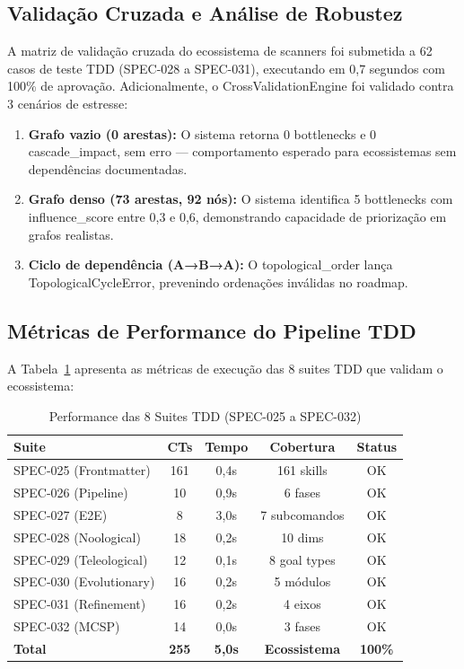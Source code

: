 \subsection{Validação Cruzada e Análise de Robustez}

A matriz de validação cruzada do ecossistema de scanners foi submetida a 62 casos de teste TDD (SPEC-028 a SPEC-031), executando em 0,7 segundos com 100\% de aprovação. Adicionalmente, o CrossValidationEngine foi validado contra 3 cenários de estresse:

\begin{enumerate}
  \item \textbf{Grafo vazio (0 arestas):} O sistema retorna 0 bottlenecks e 0 cascade\_impact, sem erro --- comportamento esperado para ecossistemas sem dependências documentadas.
  \item \textbf{Grafo denso (73 arestas, 92 nós):} O sistema identifica 5 bottlenecks com influence\_score entre 0,3 e 0,6, demonstrando capacidade de priorização em grafos realistas.
  \item \textbf{Ciclo de dependência (A→B→A):} O topological\_order lança TopologicalCycleError, prevenindo ordenações inválidas no roadmap.
\end{enumerate}

\subsection{Métricas de Performance do Pipeline TDD}

A Tabela~\ref{tab:tdd-performance} apresenta as métricas de execução das 8 suites TDD que validam o ecossistema:

\begin{table}[H]
\centering
\caption{Performance das 8 Suites TDD (SPEC-025 a SPEC-032)}
\label{tab:tdd-performance}
\begin{tabular}{p{2.5cm}cccc}
\toprule
\textbf{Suite} & \textbf{CTs} & \textbf{Tempo} & \textbf{Cobertura} & \textbf{Status} \\
\midrule
SPEC-025 (Frontmatter) & 161 & 0,4s & 161 skills & OK \\
SPEC-026 (Pipeline) & 10 & 0,9s & 6 fases & OK \\
SPEC-027 (E2E) & 8 & 3,0s & 7 subcomandos & OK \\
SPEC-028 (Noological) & 18 & 0,2s & 10 dims & OK \\
SPEC-029 (Teleological) & 12 & 0,1s & 8 goal types & OK \\
SPEC-030 (Evolutionary) & 16 & 0,2s & 5 módulos & OK \\
SPEC-031 (Refinement) & 16 & 0,2s & 4 eixos & OK \\
SPEC-032 (MCSP) & 14 & 0,0s & 3 fases & OK \\
\addlinespace
\textbf{Total} & \textbf{255} & \textbf{5,0s} & \textbf{Ecossistema} & \textbf{100\%} \\
\bottomrule
\end{tabular}
\end{table}

